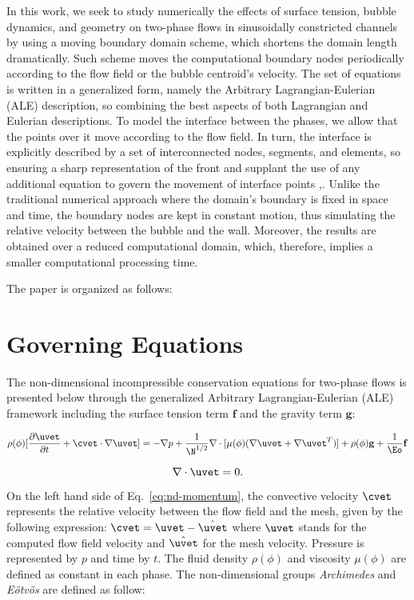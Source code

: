 \documentclass[12pt,fleqn]{article}
\begin{document}
In this work, we seek to study numerically the effects of surface
tension, bubble dynamics, and geometry on two-phase flows in
sinusoidally constricted channels by using a moving boundary domain
scheme, which shortens the domain length dramatically. Such scheme moves
the computational boundary nodes periodically according to the flow
field or the bubble centroid's velocity. The set of equations is written
in a generalized form, namely the Arbitrary Lagrangian-Eulerian (ALE)
description, so combining the best aspects of both Lagrangian and
Eulerian descriptions. To model the interface between the phases, we
allow that the points over it move according to the flow field. In turn,
the interface is explicitly described by a set of interconnected nodes,
segments, and elements, so ensuring a sharp representation of the front
and supplant the use of any additional equation to govern the movement
of interface points \cite{anjos2012},\cite{anjos2014}. Unlike the
traditional numerical approach where the domain's boundary is fixed in
space and time, the boundary nodes are kept in constant motion, thus
simulating the relative velocity between the bubble and the wall.
Moreover, the results are obtained over a reduced computational domain,
which, therefore, implies a smaller computational processing time.

The paper is organized as follows:


\section{Governing Equations}
The non-dimensional incompressible conservation equations for two-phase
flows is presented below through the generalized Arbitrary
Lagrangian-Eulerian (ALE) framework including the surface tension term
$\mathbf{f}$ and the gravity term $\mathbf{g}$: 

\begin{equation}
	\rho(\phi) [ \frac{\partial \uvet}{\partial t} 
	+ \cvet \cdot \nabla \uvet ]
	=
	- \nabla p 
	+ \frac{1}{\N^{1/2}} \nabla \cdot
	[\mu(\phi) ( \nabla \uvet + \nabla \uvet^T)]+
	\rho(\phi) \mathbf{g}+
	\frac{1}{\Eo} \mathbf{f}
	\label{eq:nd-momentum}
\end{equation}

\begin{equation}
	\nabla \cdot \uvet
	= 
	0.
\label{eq:nd-continuity} 
\end{equation}

On the left hand side of Eq.~\ref{eq:nd-momentum}, the convective velocity
$\cvet$ represents the relative velocity between the flow field and the
mesh, given by the following expression: $\cvet = \uvet - \hat{\uvet}$
where $\uvet$ stands for the computed flow field velocity and
$\hat{\uvet}$ for the mesh velocity. Pressure is represented by $p$ and
time by $t$. The fluid density $\rho(\phi)$ and viscosity $\mu(\phi)$
are defined as constant in each phase. The non-dimensional groups
\textit{Archimedes} and \textit{E\"otv\"os} are defined as follow:
\end{document}
